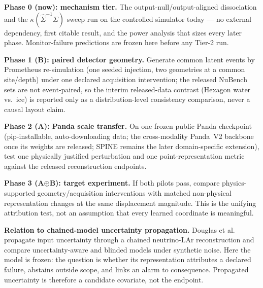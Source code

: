 \documentclass[10pt,twocolumn]{extarticle}
\begin{document}
\begin{tcolorbox}[colback=black!3,colframe=black!35,boxrule=0.4pt,
  left=4pt,right=4pt,top=3pt,bottom=3pt,arc=1pt]
\footnotesize
\textbf{Phase 0 (now): mechanism tier.} The output-null/output-aligned
dissociation and the $\kappa(\hat\Sigma^{-1}\Sigma)$ sweep run on the
controlled simulator today --- no external dependency, first citable result,
and the power analysis that sizes every later phase. Monitor-failure
predictions are frozen here before any Tier-2 run.

\textbf{Phase 1 (B): paired detector geometry.} Generate common latent events
by Prometheus re-simulation (one seeded injection, two geometries at a common
site/depth) under one declared acquisition intervention; the released NuBench
sets are not event-paired, so the interim released-data contrast (Hexagon
water vs.\ ice) is reported only as a distribution-level consistency
comparison, never a causal layout claim.

\textbf{Phase 2 (A): Panda scale transfer.} On one frozen public Panda
checkpoint (pip-installable, auto-downloading data; the cross-modality Panda~V2
backbone~\cite{panda2} once its weights are released; SPINE remains the later
domain-specific extension), test one physically justified perturbation and one
point-representation metric against the released reconstruction endpoints.

\textbf{Phase 3 (A$\oplus$B): target experiment.} If both pilots pass, compare
physics-supported geometry/acquisition interventions with matched non-physical
representation changes at the same displacement magnitude. This is the
unifying attribution test, not an assumption that every learned coordinate is
meaningful.
\end{tcolorbox}

\textbf{Relation to chained-model uncertainty propagation.} Douglas et
al.~\cite{douglas2024} propagate input uncertainty through a chained
neutrino-LAr reconstruction and compare uncertainty-aware and blinded models
under synthetic noise. Here the model is frozen: the question is whether its
representation attributes a declared failure, abstains outside scope, and
links an alarm to consequence. Propagated uncertainty is therefore a candidate
covariate, not the endpoint.
\end{document}
